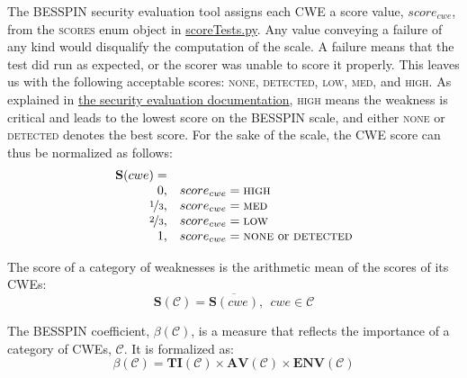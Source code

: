 \documentclass{article}
\begin{document}
The BESSPIN security evaluation tool assigns each CWE a score value, $score_{cwe}$, from the {\scshape scores} enum object in \href{https://github.com/DARPA-SSITH-Demonstrators/SSITH-FETT-Target/blob/develop/fett/cwesEvaluation/scoreTests.py}{scoreTests.py}. Any value conveying a failure of any kind would disqualify the computation of the scale. A failure means that the test did run as expected, or the scorer was unable to score it properly. This leaves us with the following acceptable scores: {\scshape none}, {\scshape detected}, {\scshape low}, {\scshape med}, and {\scshape high}. As explained in \href{https://github.com/DARPA-SSITH-Demonstrators/SSITH-FETT-Target/blob/develop/docs/cwesEvaluation/besspinPhilosophy.md}{the security evaluation documentation}, {\scshape high} means the weakness is critical and leads to the lowest score on the BESSPIN scale, and either {\scshape none} or {\scshape detected} denotes the best score. For the sake of the scale, the CWE score can thus be normalized as follows:
\begin{equation}
\begin{array}{rl}
\mathbf{S}(cwe) = \\ 
      0, &   score_{cwe} = \text{{\scshape high}} \\
      \nicefrac{1}{3}, & score_{cwe} = \text{{\scshape med}} \\
      \nicefrac{2}{3}, & score_{cwe} = \text{{\scshape low}} \\
      1, &    score_{cwe} = \text{{\scshape none} or {\scshape detected}}
\end{array}
\end{equation}

The score of a category of weaknesses is the arithmetic mean of the scores of its CWEs:
\begin{equation}
    \mathbf{S}(\mathcal{C}) = \overline{\mathbf{S}(cwe)}, \ \ cwe \in \mathcal{C}
\end{equation}

The BESSPIN coefficient, $\beta(\mathcal{C})$, is a measure that reflects the importance of a category of CWEs, $\mathcal{C}$. It is formalized as: 
\begin{equation}
    \beta(\mathcal{C}) = \mathbf{TI}(\mathcal{C}) 
    \times \mathbf{AV}(\mathcal{C}) 
    \times \mathbf{ENV}(\mathcal{C})
\end{equation}
\end{document}
